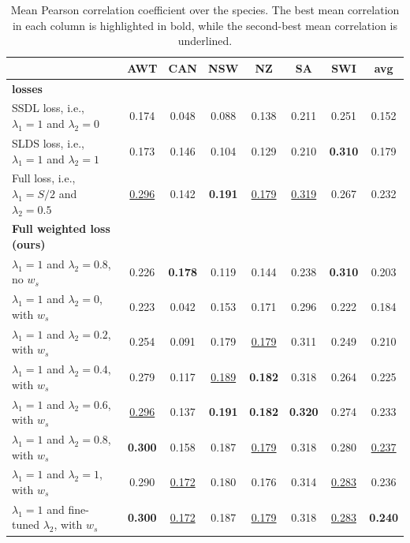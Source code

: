 \begin{table}[]
\centering
\caption{Mean Pearson correlation coefficient over the species. The best mean correlation in each column is highlighted in bold, while the second-best mean correlation is underlined.}

\setlength{\tabcolsep}{0.46\tabcolsep}  %
\renewcommand{\arraystretch}{1.2} %
\begin{tabular}{lccccccc}
                                                                          & AWT   & CAN   & NSW   & NZ    & SA    & SWI   & \textbf{avg}   \\ 
    \hline \hline
    \textbf{\cite{cole2023spatial} losses} \\
    SSDL loss, i.e., $\lambda_1 = 1$ and $\lambda_2=0$                    & 0.174 & 0.048 & 0.088 & 0.138 & 0.211 & 0.251 & 0.152 \\
    SLDS loss, i.e., $\lambda_1 = 1$ and $\lambda_2=1$                    & 0.173 & 0.146 & 0.104 & 0.129 & 0.210 & \textbf{0.310} & 0.179 \\
    Full loss, i.e., $\lambda_1 = S/2$ and $\lambda_2=0.5$                & \underline{0.296} & 0.142 & \textbf{0.191} & \underline{0.179} & \underline{0.319} & 0.267 & 0.232 \\
    \hline \hline
    \textbf{Full weighted loss (ours)} \\    
    $\lambda_1=1 $ and $ \lambda_2=0.8$, no $w_s$                         & 0.226 & \textbf{0.178} & 0.119 & 0.144 & 0.238 & \textbf{0.310} & 0.203 \\
    \hline
    $\lambda_1=1 $ and $ \lambda_2=0$, with $w_s$                         & 0.223 & 0.042 & 0.153 & 0.171 & 0.296 & 0.222 & 0.184 \\
    $\lambda_1=1 $ and $ \lambda_2=0.2$, with $w_s$                       & 0.254 & 0.091 & 0.179 & \underline{0.179} & 0.311 & 0.249 & 0.210 \\
    $\lambda_1=1 $ and $ \lambda_2=0.4$, with $w_s$                       & 0.279 & 0.117 & \underline{0.189} & \textbf{0.182} & 0.318 & 0.264 & 0.225 \\
    $\lambda_1=1 $ and $ \lambda_2=0.6$, with $w_s$                       & \underline{0.296} & 0.137 & \textbf{0.191} & \textbf{0.182} & \textbf{0.320} & 0.274 & 0.233 \\
    $\lambda_1=1 $ and $ \lambda_2=0.8$, with $w_s$                       & \textbf{0.300} & 0.158 & 0.187 & \underline{0.179} & 0.318 & 0.280 & \underline{0.237} \\
    $\lambda_1=1 $ and $ \lambda_2=1$, with $w_s$                         & 0.290 & \underline{0.172} & 0.180 & 0.176 & 0.314 & \underline{0.283} & 0.236 \\
    \hline
    $\lambda_1=1 $ and fine-tuned $\lambda_2$, with $w_s$                 & \textbf{0.300} & \underline{0.172} & 0.187 & \underline{0.179} & 0.318 & \underline{0.283} & \textbf{0.240} \\
    \hline
\end{tabular}
\vspace{0.1cm} \\

\label{tab:comparison_cor}
\end{table}